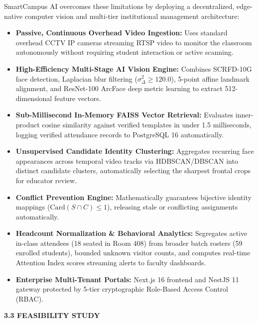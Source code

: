 \noindent SmartCampus AI overcomes these limitations by deploying a decentralized, edge-native computer vision and multi-tier institutional management architecture:
\begin{itemize}
    \item \textbf{Passive, Continuous Overhead Video Ingestion:} Uses standard overhead CCTV IP cameras streaming RTSP video to monitor the classroom autonomously without requiring student interaction or active scanning.
    \item \textbf{High-Efficiency Multi-Stage AI Vision Engine:} Combines SCRFD-10G face detection, Laplacian blur filtering ($\sigma^2_\Delta \ge 120.0$), 5-point affine landmark alignment, and ResNet-100 ArcFace deep metric learning to extract 512-dimensional feature vectors.
    \item \textbf{Sub-Millisecond In-Memory FAISS Vector Retrieval:} Evaluates inner-product cosine similarity against verified templates in under 1.5 milliseconds, logging verified attendance records to PostgreSQL 16 automatically.
    \item \textbf{Unsupervised Candidate Identity Clustering:} Aggregates recurring face appearances across temporal video tracks via HDBSCAN/DBSCAN into distinct candidate clusters, automatically selecting the sharpest frontal crops for educator review.
    \item \textbf{Conflict Prevention Engine:} Mathematically guarantees bijective identity mappings ($\text{Card}(S \cap C) \le 1$), releasing stale or conflicting assignments automatically.
    \item \textbf{Headcount Normalization \& Behavioral Analytics:} Segregates active in-class attendees (18 seated in Room 408) from broader batch rosters (59 enrolled students), bounded unknown visitor counts, and computes real-time Attention Index scores streaming alerts to faculty dashboards.
    \item \textbf{Enterprise Multi-Tenant Portals:} Next.js 16 frontend and NestJS 11 gateway protected by 5-tier cryptographic Role-Based Access Control (RBAC).
\end{itemize}

\vspace{0.2in}
\begin{flushleft}
{\fontsize{14pt}{18pt}\selectfont \textbf{3.3 FEASIBILITY STUDY}}\\[2mm]
\end{flushleft}

